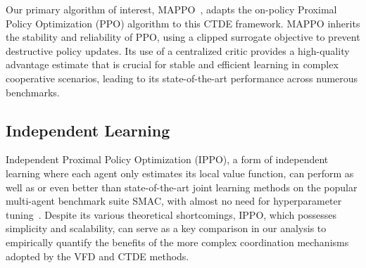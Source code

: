 Our primary algorithm of interest, MAPPO~\cite{yuSurprisingEffectivenessPPO2022}, adapts the on-policy Proximal Policy Optimization (PPO) algorithm to this CTDE framework. MAPPO inherits the stability and reliability of PPO, using a clipped surrogate objective to prevent destructive policy updates. Its use of a centralized critic provides a high-quality advantage estimate that is crucial for stable and efficient learning in complex cooperative scenarios, leading to its state-of-the-art performance across numerous benchmarks.

\subsection{Independent Learning}
Independent Proximal Policy Optimization (IPPO), a form of independent learning where each agent only estimates its local value function, can perform as well as or even better than state-of-the-art joint learning methods on the popular multi-agent benchmark suite SMAC, with almost no need for hyperparameter tuning~\cite{wittIndependentLearningAll2020}.
Despite its various theoretical shortcomings, IPPO, which possesses simplicity and scalability, can serve as a key comparison in our analysis to empirically quantify the benefits of the more complex coordination mechanisms adopted by the VFD and CTDE methods.
